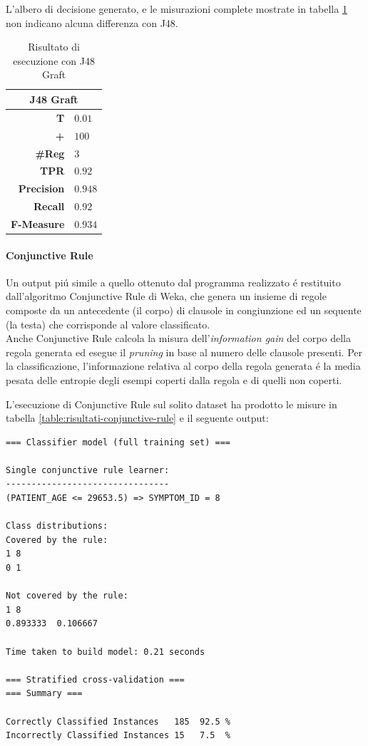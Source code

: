 \documentclass[preprint]{acm_proc_article-sp}
\begin{document}
L'albero di decisione generato, e le misurazioni complete mostrate in tabella \ref{table:risultati-j48-graft} non indicano alcuna differenza con J48.

\begin{table}[h]
\centering
\begin{tabular}{|r|l|} \hline
\multicolumn{2}{|c|}{\textbf{J48 Graft}} \\ \hline \hline 
\textbf{T} & $0.01$ \\ \hline
\textbf{+} & $100$ \\ \hline
\textbf{\#Reg} & $3$\\ \hline
\textbf{TPR} & $0.92$ \\ \hline
\textbf{Precision} & $0.948$ \\ \hline
\textbf{Recall} & $0.92$ \\  \hline
\textbf{F-Measure} & $0.934$ \\
\hline\end{tabular}
\caption{Risultato di esecuzione con J48 Graft}
\label{table:risultati-j48-graft}
\end{table}

\paragraph{Conjunctive Rule}
Un output pi\'u simile a quello ottenuto dal programma realizzato \'e restituito dall'algoritmo Conjunctive Rule di Weka, che genera un insieme di regole composte da un antecedente (il corpo) di clausole in congiunzione ed un sequente (la testa) che corrisponde al valore classificato.\\
Anche Conjunctive Rule calcola la misura dell'\textit{information gain} del corpo della regola generata ed esegue il \textit{pruning} in base al numero delle clausole presenti. Per la classificazione, l'informazione relativa al corpo della regola generata \'e la media pesata delle entropie degli esempi coperti dalla regola e di quelli non coperti.

L'esecuzione di Conjunctive Rule sul solito dataset ha prodotto le misure in tabella \ref{table:risultati-conjunctive-rule} e il seguente output:
\begin{verbatim}
=== Classifier model (full training set) ===

Single conjunctive rule learner:
--------------------------------
(PATIENT_AGE <= 29653.5) => SYMPTOM_ID = 8

Class distributions:
Covered by the rule:
1 8 
0 1 

Not covered by the rule:
1 8 
0.893333  0.106667  

Time taken to build model: 0.21 seconds

=== Stratified cross-validation ===
=== Summary ===

Correctly Classified Instances   185  92.5 %
Incorrectly Classified Instances 15   7.5  %
\end{verbatim}
\end{document}
